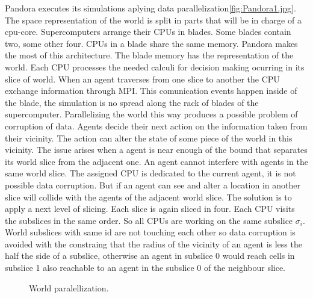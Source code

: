 \documentclass[11pt,oneside,a4paper,openright]{report}
\begin{document}
Pandora executes its simulations aplying data parallelization\ref{fig:Pandora1.jpg}. The space representation of the world is split in parts that will be in charge of a cpu-core. Supercomputers arrange their CPUs in blades. Some blades
contain two, some other four. CPUs in a blade share the same memory. Pandora makes the most of this architecture.
The blade memory has the representation of the world. Each CPU processes the needed calculi for decision
making ocurring in its slice of world. When an agent traverses from one slice to another the CPU exchange
information through MPI. This comunication events happen inside of the blade, the simulation is no spread
along the rack of blades of the supercomputer.
Parallelizing the world this way produces a possible problem of corruption of data. Agents decide their next action
on the information taken from their vicinity. The action can alter the state of some piece of the world in this
vicinity. The issue arises when a agent is near enough of the bound that separates its world slice from the 
adjacent one. An agent cannot interfere with agents in the same world slice. The assigned CPU is dedicated to
the current agent, it is not possible data corruption. But if an agent can see and alter a location in another
slice will collide with the agents of the adjacent world slice. The solution is to apply a next level of slicing.
Each slice is again sliced in four. Each CPU visits the subslices in the same order. So all CPUs are working 
on the same subslice $\sigma_i$. World subslices with same id are not touching each other so data corruption
is avoided with the constraing that the radius of the vicinity of an agent is less the half the side of a subslice,
otherwise an agent in subslice 0 would reach cells in subslice 1 also reachable to an agent in the subslice 0
of the neighbour slice. 


\begin{figure}[h!]
\centering
\setlength\fboxsep{0pt}
\setlength\fboxrule{0.5pt}
\caption{ World paralellization.}
\label{fig:Pandora1}
\end{figure}
\end{document}
